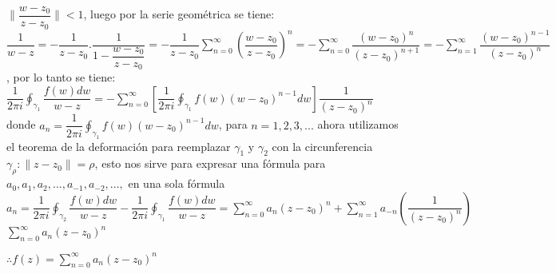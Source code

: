 \documentclass[10pt,a4paper]{article}
\begin{document}
$\displaystyle{\parallel \dfrac{w-z_0}{z-z_0} \parallel < 1}$, luego por la serie geométrica se tiene: \\
$\displaystyle{\dfrac{1}{w-z} = - \dfrac{1}{z-z_0}.\dfrac{1}{1-\dfrac{w-z_0}{z-z_0}} = -\dfrac{1}{z-z_0} \sum_{n = 0}^{\infty} (\dfrac{w-z_0}{z-z_0})^n = - \sum_{n = 0}^{\infty} \dfrac{(w-z_0)^n}{(z-z_0)^{n+1}} = - \sum_{n = 1}^{\infty} \dfrac{(w-z_0)^{n-1}}{(z-z_0)^{n}} }$, por lo tanto se tiene:\\
$\displaystyle{\dfrac{1}{2 \pi i} \oint_{\gamma_1} \dfrac{f(w)dw}{w-z} = -\sum_{n = 0}^{\infty} [\dfrac{1}{2 \pi i} \oint_{\gamma_1} f(w)(w-z_0)^{n-1}dw] \dfrac{1}{(z-z_0)^n}}$ \\
donde $\displaystyle{a_n = \dfrac{1}{2 \pi i} \oint_{\gamma_1} f(w) (w-z_0)^{n-1}dw }$, para $n = 1,2,3,...$ ahora utilizamos el teorema de la deformación para reemplazar $\gamma_1$ y $\gamma_2$ con la circunferencia $\gamma_\rho : \parallel z - z_0 \parallel = \rho$, esto nos sirve para expresar una fórmula para $a_0,a_1,a_2,...,a_{-1},a_{-2},...,$ en una sola fórmula\\
$\displaystyle{a_n = \dfrac{1}{2 \pi i} \oint_{\gamma_2} \dfrac{f(w)dw}{w-z} - \dfrac{1}{2 \pi i} \oint_{\gamma_1} \dfrac{f(w)dw}{w-z}= \sum_{n=0}^{\infty} a_n (z-z_0)^n + \sum_{n=1}^{\infty} a_{-n} (\dfrac{1}{(z-z_0)^n})}$\\
$\displaystyle{\sum_{n=0}^{\infty} a_n (z-z_0)^n}$\begin{center}
 $\displaystyle{\therefore f(z) = \sum_{n=0}^{\infty} a_n (z-z_0)^n}$
\end{center}
\end{document}
